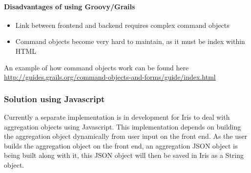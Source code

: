 \documentclass[12pt,a4paper,titlepage]{report}
\begin{document}
\paragraph{Disadvantages of using Groovy/Grails}
\begin{itemize}
  \item Link between frontend and backend requires complex command objects
  \item Command objects become very hard to maintain, as it must be index within HTML
\end{itemize}
An example of how command objects work can be found here \url{http://guides.grails.org/command-objects-and-forms/guide/index.html}
\subsubsection{Solution using Javascript}
Currently a separate implementation is in development for Iris to deal with aggregation objects using Javascript. This implementation depends on building the aggregation object dynamically from user input on the front end. As the user builds the aggregation object on the front end, an aggregation JSON object is being built along with it, this JSON object will then be saved in Iris as a String object.
\end{document}
